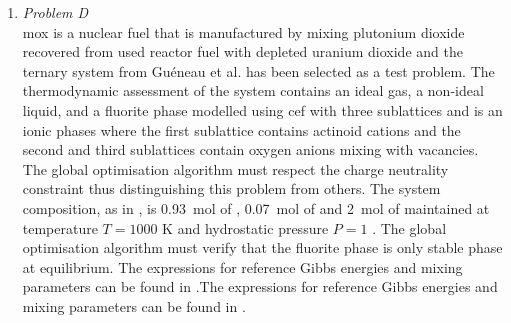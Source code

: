 \begin{enumerate}
	\item	\emph{Problem D}\\
		\gls{mox} is a nuclear fuel that is manufactured by mixing plutonium dioxide recovered from used reactor fuel with depleted uranium dioxide and the  ternary system from Gu\'{e}neau et al. \cite{Gueneau11,Gueneau:2021aa} has been selected as a test problem. The thermodynamic assessment of the system contains an ideal gas, a non-ideal liquid,  and a  fluorite phase modelled using \gls{cef} with three sublattices and is an ionic phases where the first sublattice contains actinoid cations and the second and third sublattices contain oxygen anions mixing with vacancies. The global optimisation algorithm must respect the charge neutrality constraint thus distinguishing this problem from others. The system composition, as in \cite{Piro16}, is \SI{0.93}{\mole} of , \SI{0.07}{\mole} of  and \SI{2}{\mole} of  maintained at temperature $T = 1000$ \si{\kelvin} and hydrostatic pressure $P=1$ \si{\atmosphere}. The global optimisation algorithm must verify that the  fluorite phase is only stable phase at equilibrium. The expressions for reference Gibbs energies and mixing parameters can be found in \cite{Gueneau11}.The expressions for reference Gibbs energies and mixing parameters can be found in \cite{Liu:2015aa}.
		

\end{enumerate}
